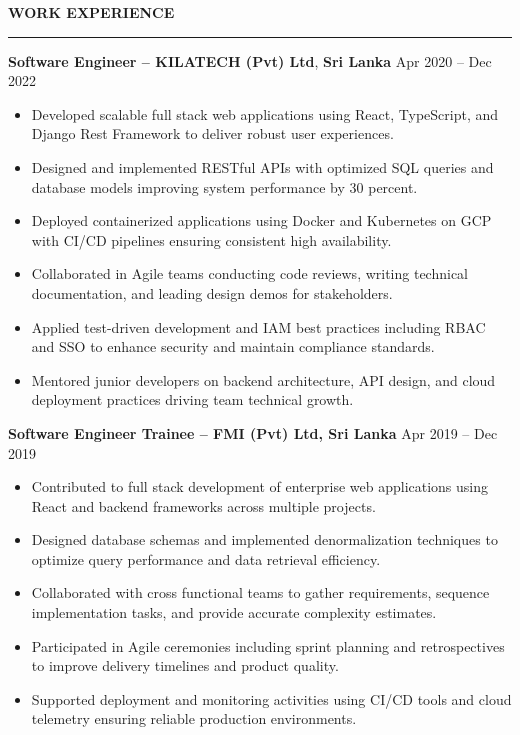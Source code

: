 \documentclass[10pt,letterpaper]{article}
\begin{document}
\vspace{8pt}

\textbf{WORK EXPERIENCE}\\[-8pt]
\noindent\rule{\textwidth}{1pt}

\vspace{-2pt}

\textbf{Software Engineer -- KILATECH (Pvt) Ltd}, \textbf{Sri Lanka} \hfill Apr 2020 -- Dec 2022

\vspace{-1pt}

\begin{itemize}
\item Developed scalable full stack web applications using React, TypeScript, and Django Rest Framework to deliver robust user experiences.
\item Designed and implemented RESTful APIs with optimized SQL queries and database models improving system performance by 30 percent.
\item Deployed containerized applications using Docker and Kubernetes on GCP with CI/CD pipelines ensuring consistent high availability.
\item Collaborated in Agile teams conducting code reviews, writing technical documentation, and leading design demos for stakeholders.
\item Applied test-driven development and IAM best practices including RBAC and SSO to enhance security and maintain compliance standards.
\item Mentored junior developers on backend architecture, API design, and cloud deployment practices driving team technical growth.
\end{itemize}

\textbf{Software Engineer Trainee -- FMI (Pvt) Ltd, Sri Lanka} \hfill Apr 2019 -- Dec 2019

\vspace{-1pt}

\begin{itemize}
\item Contributed to full stack development of enterprise web applications using React and backend frameworks across multiple projects.
\item Designed database schemas and implemented denormalization techniques to optimize query performance and data retrieval efficiency.
\item Collaborated with cross functional teams to gather requirements, sequence implementation tasks, and provide accurate complexity estimates.
\item Participated in Agile ceremonies including sprint planning and retrospectives to improve delivery timelines and product quality.
\item Supported deployment and monitoring activities using CI/CD tools and cloud telemetry ensuring reliable production environments.
\end{itemize}
\end{document}
